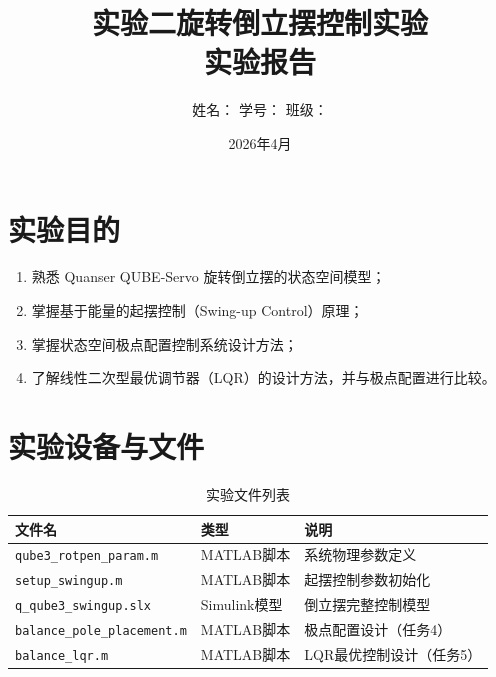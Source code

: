 \documentclass[12pt, a4paper]{article}
\title{
    \vspace{-1cm}
    {\Large \textbf{实验二\quad 旋转倒立摆控制实验}} \\[0.5em]
    {\large 实验报告}
}
\author{姓名：\underline{\quad\quad\quad\quad\quad\quad} \qquad
        学号：\underline{\quad\quad\quad\quad\quad\quad} \qquad
        班级：\underline{\quad\quad\quad\quad\quad\quad}}
\date{2026年4月}
\begin{document}

\maketitle
\thispagestyle{fancy}
\tableofcontents
\newpage

\section{实验目的}

\begin{enumerate}[leftmargin=2em]
    \item 熟悉 Quanser QUBE-Servo 旋转倒立摆的状态空间模型；
    \item 掌握基于能量的起摆控制（Swing-up Control）原理；
    \item 掌握状态空间极点配置控制系统设计方法；
    \item 了解线性二次型最优调节器（LQR）的设计方法，并与极点配置进行比较。
\end{enumerate}

\section{实验设备与文件}

\begin{table}[H]
\centering
\caption{实验文件列表}
\begin{tabular}{lll}
\toprule
文件名 & 类型 & 说明 \\
\midrule
\texttt{qube3\_rotpen\_param.m}    & MATLAB脚本 & 系统物理参数定义 \\
\texttt{setup\_swingup.m}          & MATLAB脚本 & 起摆控制参数初始化 \\
\texttt{q\_qube3\_swingup.slx}     & Simulink模型 & 倒立摆完整控制模型 \\
\texttt{balance\_pole\_placement.m}& MATLAB脚本 & 极点配置设计（任务4）\\
\texttt{balance\_lqr.m}            & MATLAB脚本 & LQR最优控制设计（任务5）\\
\bottomrule
\end{tabular}
\end{table}
\end{document}
